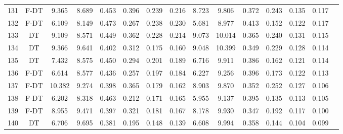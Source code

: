 \begin{longtable}{@{\hskip3pt}c@{\hskip3pt}c@{\hskip3pt}c@{\hskip3pt}c@{\hskip3pt}c@{\hskip3pt}c@{\hskip3pt}c@{\hskip3pt}c@{\hskip3pt}c@{\hskip3pt}c@{\hskip3pt}c@{\hskip3pt}c@{\hskip3pt}c@{\hskip3pt}c@{\hskip3pt}c}
        131 &           F-DT &             9.365 &       8.689 &         0.453 &       0.396 &       0.239 &        0.216 &               8.723 &       9.806 &         0.372 &       0.243 &       0.135 &        0.117 \\
        132 &           F-DT &             6.109 &       8.149 &         0.473 &       0.267 &       0.238 &        0.230 &               5.681 &       8.977 &         0.413 &       0.152 &       0.122 &        0.117 \\
        133 &             DT &             9.109 &       8.571 &         0.449 &       0.362 &       0.228 &        0.214 &               9.073 &      10.014 &         0.365 &       0.240 &       0.131 &        0.115 \\
        134 &             DT &             9.366 &       9.641 &         0.402 &       0.312 &       0.175 &        0.160 &               9.048 &      10.399 &         0.349 &       0.229 &       0.128 &        0.114 \\
        135 &             DT &             7.432 &       8.575 &         0.450 &       0.294 &       0.201 &        0.189 &               6.716 &       9.911 &         0.386 &       0.162 &       0.121 &        0.114 \\
        136 &           F-DT &             6.614 &       8.577 &         0.436 &       0.257 &       0.197 &        0.184 &               6.227 &       9.256 &         0.396 &       0.173 &       0.122 &        0.113 \\
        137 &           F-DT &            10.382 &       9.274 &         0.398 &       0.365 &       0.179 &        0.162 &               8.903 &       9.870 &         0.352 &       0.252 &       0.127 &        0.106 \\
        138 &           F-DT &             6.202 &       8.318 &         0.463 &       0.212 &       0.171 &        0.165 &               5.955 &       9.137 &         0.395 &       0.135 &       0.113 &        0.105 \\
        139 &           F-DT &             8.955 &       9.471 &         0.397 &       0.321 &       0.181 &        0.167 &               8.178 &       9.930 &         0.347 &       0.192 &       0.117 &        0.100 \\
        140 &             DT &             6.706 &       9.695 &         0.381 &       0.195 &       0.148 &        0.139 &               6.608 &       9.994 &         0.358 &       0.144 &       0.104 &        0.099 \\

\end{longtable}
